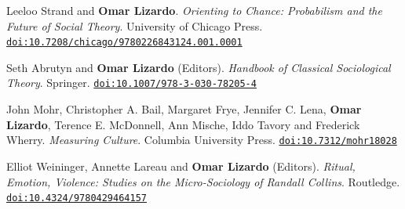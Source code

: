 \ind Leeloo Strand and {\bf Omar Lizardo}. {\em Orienting to Chance: Probabilism and the Future of Social Theory}. University of Chicago Press. \href{https://doi.org/10.7208/chicago/9780226843124.001.0001}{\nolinkurl{doi:10.7208/chicago/9780226843124.001.0001}}

\ind Seth Abrutyn and {\bf Omar Lizardo} (Editors). {\em Handbook of Classical Sociological Theory}. Springer. \href{https://doi.org/10.1007/978-3-030-78205-4}{\nolinkurl{doi:10.1007/978-3-030-78205-4}}

\ind John Mohr, Christopher A. Bail, Margaret Frye, Jennifer C. Lena, {\bf Omar Lizardo}, Terence E. McDonnell, Ann Mische, Iddo Tavory and Frederick Wherry. {\em Measuring Culture}. Columbia University Press. \href{https://doi.org/10.7312/mohr18028}{\nolinkurl{doi:10.7312/mohr18028}}

\ind Elliot Weininger, Annette Lareau and {\bf Omar Lizardo} (Editors). {\em Ritual, Emotion, Violence: Studies on the Micro-Sociology of Randall Collins}. Routledge. \href{https://doi.org/10.4324/9780429464157}{\nolinkurl{doi:10.4324/9780429464157}}


